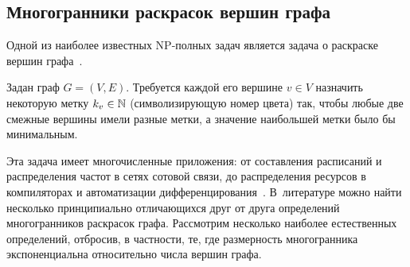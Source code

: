 




%
%

\subsection{Многогранники раскрасок вершин графа}
\label{sec:Color}

Одной из наиболее известных NP-полных задач является задача о раскраске вершин графа~\cite{Karp:1972}.

Задан граф $G = (V, E)$.
Требуется каждой его вершине $v \in V$ назначить некоторую метку $k_v \in \mathbb{N}$
(символизирующую номер цвета) так, чтобы любые две смежные вершины имели разные метки, а значение наибольшей метки было бы минимальным.

Эта задача имеет многочисленные приложения: от составления расписаний и распределения частот в сетях сотовой связи, до распределения ресурсов в компиляторах и автоматизации дифференцирования~\cite{Burke:2010,Palubeckis:2008}.
В~литературе можно найти несколько принципиально отличающихся друг от друга определений многогранников раскрасок графа.
Рассмотрим несколько наиболее естественных определений, отбросив, в частности, те, где размерность многогранника экспоненциальна относительно числа вершин графа. 

